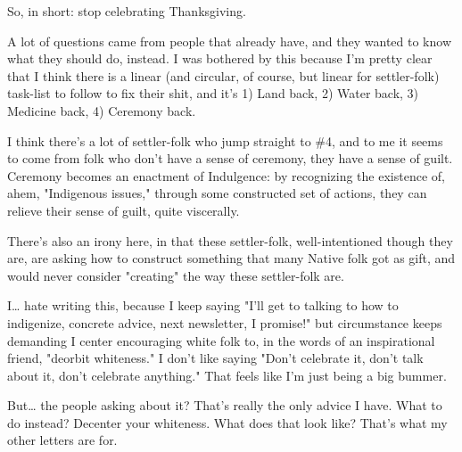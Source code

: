 \documentclass[11pt]{article}
\begin{document}
\begin{itemize}
So, in short: stop celebrating Thanksgiving.

A lot of questions came from people that already have, and they wanted to know what they should do, instead. I was bothered by this because I'm pretty clear that I think there is a linear (and circular, of course, but linear for settler-folk) task-list to follow to fix their shit, and it's 1) Land back, 2) Water back, 3) Medicine back, 4) Ceremony back.

I think there's a lot of settler-folk who jump straight to \#4, and to me it seems to come from folk who don't have a sense of ceremony, they have a sense of guilt. Ceremony becomes an enactment of Indulgence: by recognizing the existence of, ahem, "Indigenous issues," through some constructed set of actions, they can relieve their sense of guilt, quite viscerally.

There's also an irony here, in that these settler-folk, well-intentioned though they are, are asking how to construct something that many Native folk got as gift, and would never consider "creating" the way these settler-folk are.

I\ldots{} hate writing this, because I keep saying "I'll get to talking to how to indigenize, concrete advice, next newsletter, I promise!" but circumstance keeps demanding I center encouraging white folk to, in the words of an inspirational friend, "deorbit whiteness." I don't like saying "Don't celebrate it, don't talk about it, don't celebrate anything." That feels like I'm just being a big bummer.

But\ldots{} the people asking about it? That's really the only advice I have. What to do instead? Decenter your whiteness. What does that look like? That's what my other letters are for.
\end{itemize}
\stopcontents[level-4]
\end{document}

